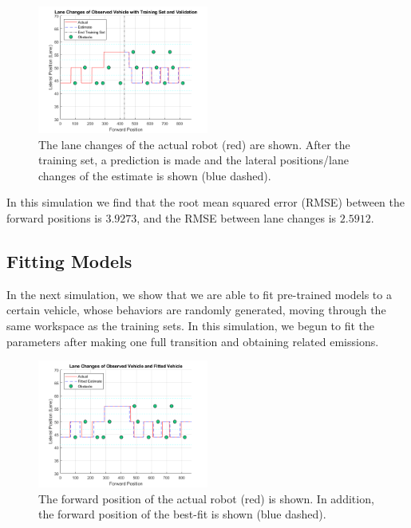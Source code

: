 \documentclass[conference]{IEEEtran}
\begin{document}
\begin{figure}[ht]
    \includegraphics[width=0.5\textwidth]{train2.png}
    \caption{The lane changes of the actual robot (red) are shown. After the training set, a prediction is made and the lateral positions/lane changes of the estimate is shown (blue dashed).}
    \label{fig:train2}
\end{figure}

In this simulation we find that the root mean squared error (RMSE) between the forward positions is $3.9273$, and the RMSE between lane changes is $2.5912$.  

\subsection{Fitting Models}

In the next simulation, we show that we are able to fit pre-trained models to a certain vehicle, whose behaviors are randomly generated, moving through the same workspace as the training sets. In this simulation, we begun to fit the parameters after making one full transition and obtaining related emissions. 

\begin{figure}[ht]
    \includegraphics[width=0.5\textwidth]{fit2.png}
    \caption{The forward position of the actual robot (red) is shown. In addition, the forward position of the best-fit is shown (blue dashed).}
    \label{fig:fwd}
\end{figure}
\end{document}
